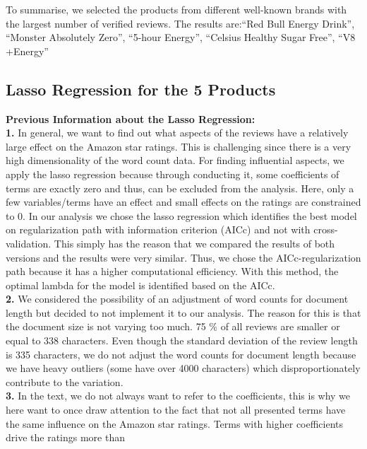 \documentclass[
]{article}
\begin{document}
To summarise, we selected the products from different well-known brands
with the largest number of verified reviews. The results are:``Red Bull
Energy Drink'', ``Monster Absolutely Zero'', ``5-hour Energy'',
``Celsius Healthy Sugar Free'', ``V8 +Energy''

\hypertarget{lasso-regression-for-the-5-products}{%
\subsection{Lasso Regression for the 5
Products}\label{lasso-regression-for-the-5-products}}

\textbf{Previous Information about the Lasso Regression:}\\

\textbf{1.} In general, we want to find out what aspects of the reviews
have a relatively large effect on the Amazon star ratings. This is
challenging since there is a very high dimensionality of the word count
data. For finding influential aspects, we apply the lasso regression
because through conducting it, some coefficients of terms are exactly
zero and thus, can be excluded from the analysis. Here, only a few
variables/terms have an effect and small effects on the ratings are
constrained to 0. In our analysis we chose the lasso regression which
identifies the best model on regularization path with information
criterion (AICc) and not with cross-validation. This simply has the
reason that we compared the results of both versions and the results
were very similar. Thus, we chose the AICc-regularization path because
it has a higher computational efficiency. With this method, the optimal
lambda for the model is identified based on the AICc.\\
\textbf{2.} We considered the possibility of an adjustment of word
counts for document length but decided to not implement it to our
analysis. The reason for this is that the document size is not varying
too much. 75 \% of all reviews are smaller or equal to 338 characters.
Even though the standard deviation of the review length is 335
characters, we do not adjust the word counts for document length because
we have heavy outliers (some have over 4000 characters) which
disproportionately contribute to the variation.\\
\textbf{3.} In the text, we do not always want to refer to the
coefficients, this is why we here want to once draw attention to the
fact that not all presented terms have the same influence on the Amazon
star ratings. Terms with higher coefficients drive the ratings more than
\end{document}
